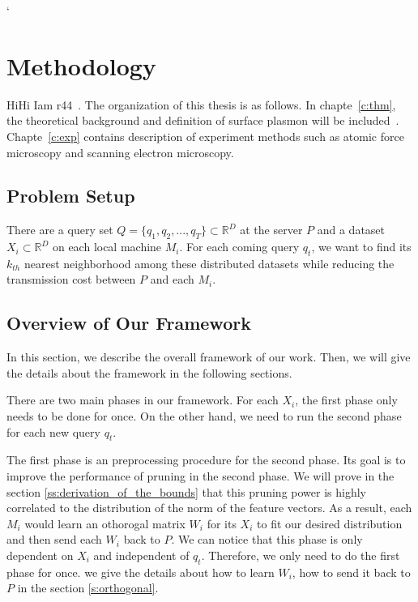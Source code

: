 `\chapter{Methodology}
\label{c:method}

HiHi Iam r44~. The organization of this thesis is as follows. In chapte~\ref{c:thm}, the theoretical background and definition of surface plasmon will be included~\cite{LeeWave}. Chapte~\ref{c:exp} contains description of experiment methods such as atomic force microscopy and scanning electron microscopy. 

\section{Problem Setup}
\label{s:probsetup}
There are a query set $Q={\{q_1,q_2,...,q_T\}}\subset\mathbb{R}^D$ at the server $P$ and a dataset $X_i\subset\mathbb{R}^D$ on each local machine $M_i$.  For each coming query $q_t$, we want to find its $k_{th}$ nearest neighborhood among these distributed datasets while reducing the transmission cost between $P$ and each $M_i$.

\section{Overview of Our Framework}
\label{s:overview}
In this section, we describe the overall framework of our work.  Then, we will give the details about the framework in the following sections.

There are two main phases in our framework.  For each $X_i$, the first phase only needs to be done for once.  On the other hand, we need to run the second phase for each new query $q_t$.

The first phase is an preprocessing procedure for the second phase. Its goal is to improve the performance of pruning in the second phase.  We will prove in the section \ref{ss:derivation_of_the_bounds} that this pruning power is highly correlated to the distribution of the norm of the feature vectors. As a result, each $M_i$ would learn an othorogal matrix $W_i$ for its $X_i$ to fit our desired distribution and then send each $W_i$ back to $P$.  We can notice that this phase is only dependent on $X_i$ and independent of $q_t$.  Therefore, we only need to do the first phase for once.  we give the details about how to learn $W_i$, how to send it back to $P$ in the section \ref{s:orthogonal}.

